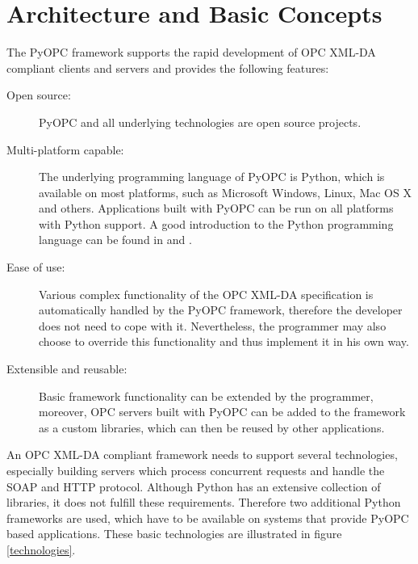 
\section {Architecture and Basic Concepts}

The PyOPC framework supports the rapid development of OPC XML-DA compliant
clients and servers and provides the following features:

\begin{description}
\item[Open source:] PyOPC and all underlying technologies are
open source projects.

\item[Multi-platform capable:] The underlying programming language of
PyOPC is Python, which is available on most platforms, such as
Microsoft Windows, Linux, Mac OS X and others. Applications built with
PyOPC can be run on all platforms with Python support. A good
introduction to the Python programming language can be found in
\cite{diveintopython} and \cite{PYTHON}.

\item[Ease of use:] Various complex functionality of the OPC XML-DA
specification is automatically handled by the PyOPC framework,
therefore the developer does not need to cope with it. Nevertheless,
the programmer may also choose to override this functionality and
thus implement it in his own way.

\item[Extensible and reusable:] Basic framework functionality
can be extended by the programmer, moreover, OPC servers built with
PyOPC can be added to the framework as a custom libraries, which can
then be reused by other applications.
\end{description}

An OPC XML-DA compliant framework needs to support several
technologies, especially building servers which process concurrent
requests and handle the SOAP and HTTP protocol. Although Python has an
extensive collection of libraries, it does not fulfill these
requirements. Therefore two additional Python frameworks are used,
which have to be available on systems that provide PyOPC based
applications. These basic technologies are illustrated in figure
\ref{technologies}.

